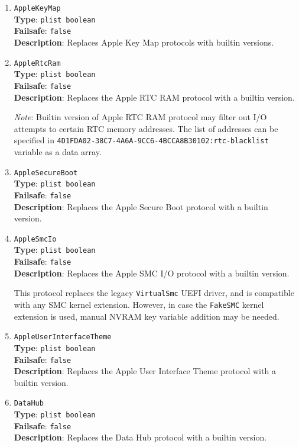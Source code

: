 \documentclass[]{article}
\begin{document}
\begin{enumerate}
\item
  \texttt{AppleKeyMap}\\
  \textbf{Type}: \texttt{plist\ boolean}\\
  \textbf{Failsafe}: \texttt{false}\\
  \textbf{Description}: Replaces Apple Key Map protocols with builtin
  versions.

\item
  \texttt{AppleRtcRam}\\
  \textbf{Type}: \texttt{plist\ boolean}\\
  \textbf{Failsafe}: \texttt{false}\\
  \textbf{Description}: Replaces the Apple RTC RAM protocol with a builtin
  version.

  \emph{Note}: Builtin version of Apple RTC RAM protocol may filter out
  I/O attempts to certain RTC memory addresses. The list of addresses
  can be specified in \texttt{4D1FDA02-38C7-4A6A-9CC6-4BCCA8B30102:rtc-blacklist}
  variable as a data array.

\item
  \texttt{AppleSecureBoot}\\
  \textbf{Type}: \texttt{plist\ boolean}\\
  \textbf{Failsafe}: \texttt{false}\\
  \textbf{Description}: Replaces the Apple Secure Boot protocol with a builtin
  version.

\item
  \texttt{AppleSmcIo}\\
  \textbf{Type}: \texttt{plist\ boolean}\\
  \textbf{Failsafe}: \texttt{false}\\
  \textbf{Description}: Replaces the Apple SMC I/O protocol with a builtin
  version.

  This protocol replaces the legacy \texttt{VirtualSmc} UEFI driver, and is compatible
  with any SMC kernel extension. However, in case the \texttt{FakeSMC} kernel extension
  is used, manual NVRAM key variable addition may be needed.

\item
  \texttt{AppleUserInterfaceTheme}\\
  \textbf{Type}: \texttt{plist\ boolean}\\
  \textbf{Failsafe}: \texttt{false}\\
  \textbf{Description}: Replaces the Apple User Interface Theme protocol with a builtin
  version.

\item
  \texttt{DataHub}\\
  \textbf{Type}: \texttt{plist\ boolean}\\
  \textbf{Failsafe}: \texttt{false}\\
  \textbf{Description}: Replaces the Data Hub protocol with a builtin version.


\end{enumerate}
\end{document}
